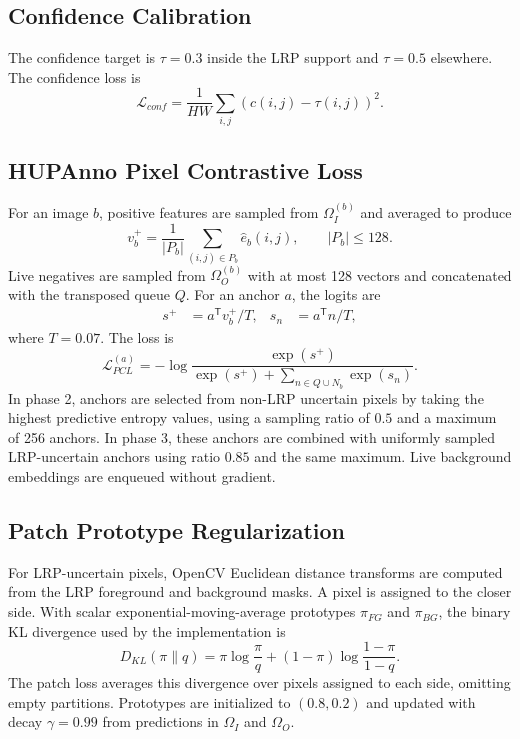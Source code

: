 \documentclass[journal]{IEEEtran}
\begin{document}
\subsection{Confidence Calibration}
The confidence target is $\tau=0.3$ inside the LRP support and $\tau=0.5$ elsewhere. The confidence loss is
\begin{equation}
 \mathcal{L}_{conf}=\frac{1}{HW}\sum_{i,j}(c(i,j)-\tau(i,j))^2.
\end{equation}

\subsection{HUPAnno Pixel Contrastive Loss}
For an image $b$, positive features are sampled from $\Omega_I^{(b)}$ and averaged to produce
\begin{equation}
 v_b^+=\frac{1}{|P_b|}\sum_{(i,j)\in P_b}\hat e_b(i,j),\qquad |P_b|\le128.
\end{equation}
Live negatives are sampled from $\Omega_O^{(b)}$ with at most 128 vectors and concatenated with the transposed queue $Q$. For an anchor $a$, the logits are
\begin{align}
 s^+&=a^\mathsf{T}v_b^+/T, &s_n&=a^\mathsf{T}n/T,
\end{align}
where $T=0.07$. The loss is
\begin{equation}
 \mathcal{L}_{PCL}^{(a)}=-\log\frac{\exp(s^+)}{\exp(s^+)+\sum_{n\in Q\cup N_b}\exp(s_n)}.
\end{equation}
In phase 2, anchors are selected from non-LRP uncertain pixels by taking the highest predictive entropy values, using a sampling ratio of $0.5$ and a maximum of 256 anchors. In phase 3, these anchors are combined with uniformly sampled LRP-uncertain anchors using ratio $0.85$ and the same maximum. Live background embeddings are enqueued without gradient.

\subsection{Patch Prototype Regularization}
For LRP-uncertain pixels, OpenCV Euclidean distance transforms are computed from the LRP foreground and background masks. A pixel is assigned to the closer side. With scalar exponential-moving-average prototypes $\pi_{FG}$ and $\pi_{BG}$, the binary KL divergence used by the implementation is
\begin{equation}
 D_{KL}(\pi\|q)=\pi\log\frac{\pi}{q}+(1-\pi)\log\frac{1-\pi}{1-q}.
\end{equation}
The patch loss averages this divergence over pixels assigned to each side, omitting empty partitions. Prototypes are initialized to $(0.8,0.2)$ and updated with decay $\gamma=0.99$ from predictions in $\Omega_I$ and $\Omega_O$.
\end{document}
